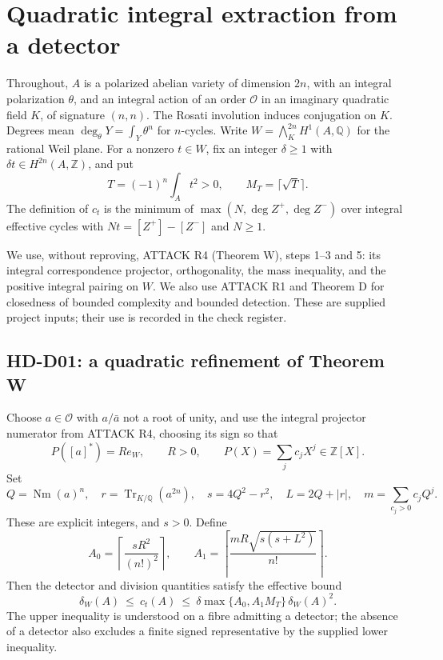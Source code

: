 \section{Quadratic integral extraction from a detector}
\label{sec:quadratic-extraction}

Throughout, $A$ is a polarized abelian variety of dimension $2n$, with an integral polarization $\theta$, and an integral action of an order $\mathcal O$ in an imaginary quadratic field $K$, of signature $(n,n).$ The Rosati involution induces conjugation on $K$. Degrees mean $\deg_\theta Y=\int_Y\theta^n$ for $n$-cycles. Write $W=\bigwedge_K^{2n}H^1(A,\mathbb Q)$ for the rational Weil plane. For a nonzero $t\in W$, fix an integer $\delta\ge1$ with $\delta t\in H^{2n}(A,\mathbb Z)$, and put
\[
 T=(-1)^n\int_A t^2>0,\qquad M_T=\lceil\sqrt T\rceil.
\]
The definition of $c_t$ is the minimum of $\max(N,\deg Z^+,\deg Z^-)$ over integral effective cycles with $Nt=[Z^+]-[Z^-]$ and $N\ge1$.

We use, without reproving, ATTACK R4 (Theorem W), steps 1--3 and 5: its integral correspondence projector, orthogonality, the mass inequality, and the positive integral pairing on $W$. We also use ATTACK R1 and Theorem D for closedness of bounded complexity and bounded detection. These are supplied project inputs; their use is recorded in the check register.

\subsection{HD-D01: a quadratic refinement of Theorem W}
Choose $a\in\mathcal O$ with $a/\bar a$ not a root of unity, and use the integral projector numerator from ATTACK R4, choosing its sign so that
\[
 P([a]^*)=R e_W,\qquad R>0,\qquad P(X)=\sum_jc_jX^j\in\mathbb Z[X].
\]
Set
\[
 Q=\operatorname{Nm}(a)^n,\quad r=\operatorname{Tr}_{K/\mathbb Q}(a^{2n}),\quad
 s=4Q^2-r^2,\quad L=2Q+|r|,\quad
 m=\sum_{c_j>0}c_jQ^j.
\]
These are explicit integers, and $s>0$. Define
\[
 A_0=\left\lceil\frac{sR^2}{(n!)^2}\right\rceil,\qquad
 A_1=\left\lceil\frac{mR\sqrt{s(s+L^2)}}{n!}\right\rceil.
\]
Then the detector and division quantities satisfy the effective bound
\begin{equation}\label{eq:quadratic-general}
 \delta_W(A)\ \le\ c_t(A)\ \le\
 \delta\max\{A_0,A_1M_T\}\,\delta_W(A)^2.
\end{equation}
The upper inequality is understood on a fibre admitting a detector; the absence of a detector also excludes a finite signed representative by the supplied lower inequality.

